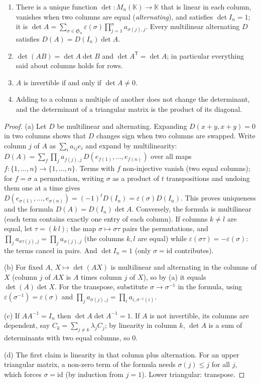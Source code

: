 \begin{theorem}[determinant]\label{thm:det}
\begin{enumerate}[label=(\alph*)]
\item There is a unique function $\det:M_n(\mathbb K)\to\mathbb K$ that is linear in each column, vanishes when two columns are equal (\emph{alternating}), and satisfies $\det I_n=1$; it is $\det A=\sum_{\sigma\in\mathfrak S_n}\varepsilon(\sigma)\prod_{j=1}^na_{\sigma(j),j}$. Every multilinear alternating $D$ satisfies $D(A)=D(I_n)\det A$.
\item $\det(AB)=\det A\det B$ and $\det A^{\mathsf T}=\det A$; in particular everything said about columns holds for rows.
\item $A$ is invertible if and only if $\det A\ne0$.
\item Adding to a column a multiple of another does not change the determinant, and the determinant of a triangular matrix is the product of its diagonal.
\end{enumerate}
\end{theorem}
\begin{proof}
(a) Let $D$ be multilinear and alternating. Expanding $D(x+y,x+y)=0$ in two columns shows that $D$ changes sign when two columns are swapped. Write column $j$ of $A$ as $\sum_ia_{ij}e_i$ and expand by multilinearity: $D(A)=\sum_{f}\prod_ja_{f(j),j}\,D(e_{f(1)},\dots,e_{f(n)})$ over all maps $f:\{1,\dots,n\}\to\{1,\dots,n\}$. Terms with $f$ non-injective vanish (two equal columns); for $f=\sigma$ a permutation, writing $\sigma$ as a product of $t$ transpositions and undoing them one at a time gives $D(e_{\sigma(1)},\dots,e_{\sigma(n)})=(-1)^tD(I_n)=\varepsilon(\sigma)D(I_n)$. This proves uniqueness and the formula $D(A)=D(I_n)\det A$.
Conversely, the formula is multilinear (each term contains exactly one entry of each column). If columns $k\ne l$ are equal, let $\tau=(k\,l)$; the map $\sigma\mapsto\sigma\tau$ pairs the permutations, and $\prod_ja_{\sigma\tau(j),j}=\prod_ja_{\sigma(j),j}$ (the columns $k,l$ are equal) while $\varepsilon(\sigma\tau)=-\varepsilon(\sigma)$: the terms cancel in pairs. And $\det I_n=1$ (only $\sigma=\mathrm{id}$ contributes).

(b) For fixed $A$, $X\mapsto\det(AX)$ is multilinear and alternating in the columns of $X$ (column $j$ of $AX$ is $A$ times column $j$ of $X$), so by (a) it equals $\det(A)\det X$. For the transpose, substitute $\sigma\to\sigma^{-1}$ in the formula, using $\varepsilon(\sigma^{-1})=\varepsilon(\sigma)$ and $\prod_ja_{\sigma(j),j}=\prod_ia_{i,\sigma^{-1}(i)}$.

(c) If $AA^{-1}=I_n$ then $\det A\det A^{-1}=1$. If $A$ is not invertible, its columns are dependent, say $C_k=\sum_{j\ne k}\lambda_jC_j$; by linearity in column $k$, $\det A$ is a sum of determinants with two equal columns, so $0$.

(d) The first claim is linearity in that column plus alternation. For an upper triangular matrix, a non-zero term of the formula needs $\sigma(j)\le j$ for all $j$, which forces $\sigma=\mathrm{id}$ (by induction from $j=1$). Lower triangular: transpose.
\end{proof}

